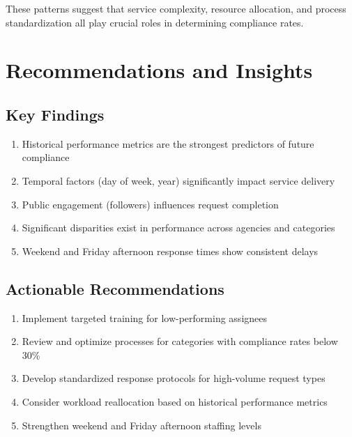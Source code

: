 \documentclass[12pt]{report}
\begin{document}
These patterns suggest that service complexity, resource allocation, and process standardization all play crucial roles in determining compliance rates.
\chapter{Recommendations and Insights}

\section{Key Findings}
\begin{enumerate}
    \item Historical performance metrics are the strongest predictors of future compliance
    \item Temporal factors (day of week, year) significantly impact service delivery
    \item Public engagement (followers) influences request completion
    \item Significant disparities exist in performance across agencies and categories
    \item Weekend and Friday afternoon response times show consistent delays
\end{enumerate}

\section{Actionable Recommendations}
\begin{enumerate}
    \item Implement targeted training for low-performing assignees
    \item Review and optimize processes for categories with compliance rates below 30\%
    \item Develop standardized response protocols for high-volume request types
    \item Consider workload reallocation based on historical performance metrics
    \item Strengthen weekend and Friday afternoon staffing levels
\end{enumerate}
\end{document}
